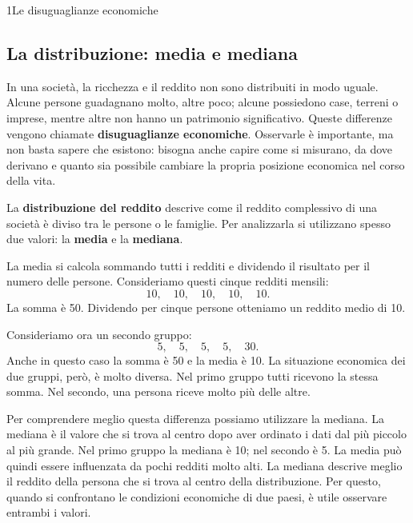 \clearpage{}


\begin{lettura}{1}{Le disuguaglianze economiche}

\subsection*{La distribuzione: media e mediana}
In una società, la ricchezza e il reddito non sono distribuiti in modo uguale. Alcune persone guadagnano molto, altre poco; alcune possiedono case, terreni o imprese, mentre altre non hanno un patrimonio significativo. Queste differenze vengono chiamate \textbf{disuguaglianze economiche}. Osservarle è importante, ma non basta sapere che esistono: bisogna anche capire come si misurano, da dove derivano e quanto sia possibile cambiare la propria posizione economica nel corso della vita.

La \textbf{distribuzione del reddito} descrive come il reddito complessivo di una società è diviso tra le persone o le famiglie. Per analizzarla si utilizzano spesso due valori: la \textbf{media} e la \textbf{mediana}.

La media si calcola sommando tutti i redditi e dividendo il risultato per il numero delle persone. Consideriamo questi cinque redditi mensili:
\[
10,\quad 10,\quad 10,\quad 10,\quad 10.
\]
La somma è 50. Dividendo per cinque persone otteniamo un reddito medio di 10.

Consideriamo ora un secondo gruppo:
\[
5,\quad 5,\quad 5,\quad 5,\quad 30.
\]
Anche in questo caso la somma è 50 e la media è 10. La situazione economica dei due gruppi, però, è molto diversa. Nel primo gruppo tutti ricevono la stessa somma. Nel secondo, una persona riceve molto più delle altre.

Per comprendere meglio questa differenza possiamo utilizzare la mediana. La mediana è il valore che si trova al centro dopo aver ordinato i dati dal più piccolo al più grande. Nel primo gruppo la mediana è 10; nel secondo è 5. La media può quindi essere influenzata da pochi redditi molto alti. La mediana descrive meglio il reddito della persona che si trova al centro della distribuzione. Per questo, quando si confrontano le condizioni economiche di due paesi, è utile osservare entrambi i valori.


\end{lettura}

